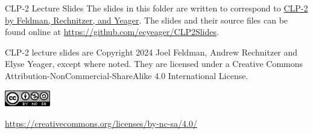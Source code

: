 \documentclass[10pt]{beamer}
\begin{document}

\begin{frame}{CLP-2 Lecture Slides}
The slides in this folder are written to correspond to \href{https://secure.math.ubc.ca/~CLP/CLP2/}{CLP-2 by Feldman, Rechnitzer, and Yeager}. The slides and their source files can be found online at \url{https://github.com/ecyeager/CLP2Slides}.
\vfill

CLP-2 lecture slides are Copyright 2024 Joel Feldman, Andrew Rechnitzer and Elyse Yeager, except where noted.
They are licensed under a Creative Commons Attribution-NonCommercial-ShareAlike 4.0 International License.
\begin{center}
\includegraphics[height=7mm]{clipart/CC}
\end{center}
\url{https://creativecommons.org/licenses/by-nc-sa/4.0/}
 \end{frame}

\end{document}
